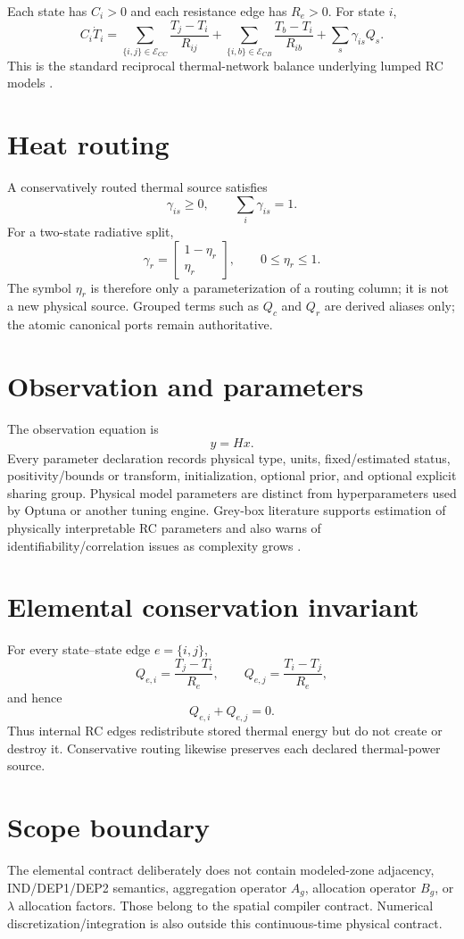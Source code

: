 \documentclass[11pt]{article}
\begin{document}
Each state has $C_i>0$ and each resistance edge has $R_e>0$.  For state $i$,
\[
C_i\dot T_i
=
\sum_{\{i,j\}\in\mathcal E_{CC}}\frac{T_j-T_i}{R_{ij}}
+
\sum_{\{i,b\}\in\mathcal E_{CB}}\frac{T_b-T_i}{R_{ib}}
+
\sum_s\gamma_{is}Q_s.
\]
This is the standard reciprocal thermal-network balance underlying lumped RC models \citep{GhiausAhmad2020ThermalCircuits,BelicSliskovicHocenski2021MultiZoneRC}.

\section{Heat routing}
A conservatively routed thermal source satisfies
\[
\gamma_{is}\ge0,\qquad \sum_i\gamma_{is}=1.
\]
For a two-state radiative split,
\[
\gamma_r=\begin{bmatrix}1-\eta_r\\\eta_r\end{bmatrix},\qquad 0\le\eta_r\le1.
\]
The symbol $\eta_r$ is therefore only a parameterization of a routing column; it is not a new physical source.  Grouped terms such as $Q_c$ and $Q_r$ are derived aliases only; the atomic canonical ports remain authoritative.

\section{Observation and parameters}
The observation equation is
\[
y=Hx.
\]
Every parameter declaration records physical type, units, fixed/estimated status, positivity/bounds or transform, initialization, optional prior, and optional explicit sharing group.  Physical model parameters are distinct from hyperparameters used by Optuna or another tuning engine.  Grey-box literature supports estimation of physically interpretable RC parameters and also warns of identifiability/correlation issues as complexity grows \citep{BacherMadsen2011HeatDynamics,WangChenLi2019RCSimplification,MartyJourjonEtAl2022RCIdentifiability}.

\section{Elemental conservation invariant}
For every state--state edge $e=\{i,j\}$,
\[
Q_{e,i}=\frac{T_j-T_i}{R_e},\qquad
Q_{e,j}=\frac{T_i-T_j}{R_e},
\]
and hence
\[
Q_{e,i}+Q_{e,j}=0.
\]
Thus internal RC edges redistribute stored thermal energy but do not create or destroy it.  Conservative routing likewise preserves each declared thermal-power source.

\section{Scope boundary}
The elemental contract deliberately does not contain modeled-zone adjacency, IND/DEP1/DEP2 semantics, aggregation operator $A_g$, allocation operator $B_g$, or $\lambda$ allocation factors.  Those belong to the spatial compiler contract.  Numerical discretization/integration is also outside this continuous-time physical contract.



\end{document}
